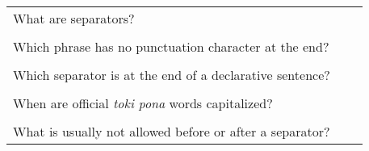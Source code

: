 \begin{supertabular}{p{5cm}|ll}
What are separators? &&                                      \\ %
 && \\ %
Which phrase has no punctuation character at the end? &&     \\ %
 && \\ %
Which separator is at the end of a declarative sentence? &&  \\ %
 && \\ %
When are official \textit{toki pona} words capitalized? &&   \\ %
 && \\ %
What is usually not allowed before or after a separator? &&  \\ %

\end{supertabular} \\%
%
